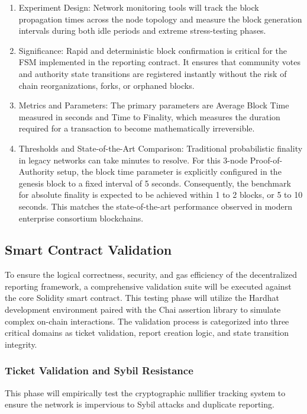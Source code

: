 \begin{enumerate}
    \item Experiment Design: Network monitoring tools will track the block propagation times across the node topology and measure the block generation intervals during both idle periods and extreme stress-testing phases.
    \item Significance: Rapid and deterministic block confirmation is critical for the \ac{FSM} implemented in the reporting contract. It ensures that community votes and authority state transitions are registered instantly without the risk of chain reorganizations, forks, or orphaned blocks.
    \item Metrics and Parameters: The primary parameters are Average Block Time measured in seconds and Time to Finality, which measures the duration required for a transaction to become mathematically irreversible.
    \item Thresholds and State-of-the-Art Comparison: Traditional probabilistic finality in legacy networks can take minutes to resolve. For this 3-node Proof-of-Authority setup, the block time parameter is explicitly configured in the genesis block to a fixed interval of 5 seconds. Consequently, the benchmark for absolute finality is expected to be achieved within 1 to 2 blocks, or 5 to 10 seconds. This matches the state-of-the-art performance observed in modern enterprise consortium blockchains.
\end{enumerate}

\subsection{Smart Contract Validation}
\label{subsec:smart-contract-validation}

To ensure the logical correctness, security, and gas efficiency of the decentralized reporting framework, a comprehensive validation suite will be executed against the core Solidity smart contract. This testing phase will utilize the Hardhat development environment paired with the Chai assertion library to simulate complex on-chain interactions. The validation process is categorized into three critical domains as ticket validation, report creation logic, and state transition integrity.

\subsubsection{Ticket Validation and Sybil Resistance}
This phase will empirically test the cryptographic nullifier tracking system to ensure the network is impervious to Sybil attacks and duplicate reporting.

